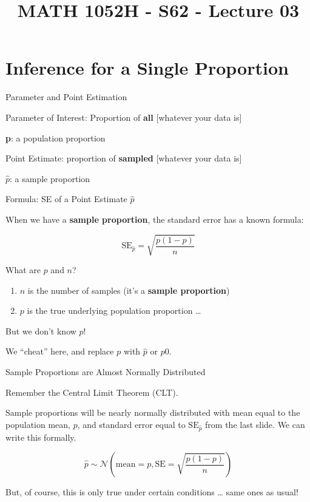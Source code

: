 \documentclass[
  ignorenonframetext,
]{beamer}
\title{MATH 1052H - S62 - Lecture 03}
\date{}
\providecommand{\tightlist}{%
  \setlength{\itemsep}{0pt}\setlength{\parskip}{0pt}}
\begin{document}
\frame{\titlepage}

\begin{frame}

\end{frame}

\hypertarget{inference-for-a-single-proportion}{%
\section{Inference for a Single
Proportion}\label{inference-for-a-single-proportion}}

\begin{frame}{Parameter and Point Estimation}
\protect\hypertarget{parameter-and-point-estimation}{}

\protect\hypertarget{highlight}{}{Parameter of Interest}: Proportion of
\textbf{all} {[}whatever your data is{]}

\textbf{p}: a population proportion

\protect\hypertarget{highlight}{}{Point Estimate}: proportion of
\textbf{sampled} {[}whatever your data is{]}

\textbf{\(\hat{p}\)}: a sample proportion

\end{frame}

\begin{frame}{Formula: SE of a Point Estimate \(\hat{p}\)}
\protect\hypertarget{formula-se-of-a-point-estimate-hatp}{}

When we have a \textbf{sample proportion}, the standard error has a
known formula:

\[
\text{SE}_{\hat{p}} = \sqrt{\frac{p(1-p)}{n}}
\]

What are \(p\) and \(n\)?

\begin{enumerate}
\tightlist
\item
  \(n\) is the number of samples (it's a \textbf{sample proportion})
\item
  \(p\) is the true underlying population proportion \ldots{}
\end{enumerate}

But we don't know \(p\)!

We ``cheat'' here, and replace \(p\) with \(\hat{p}\) or \(p0\).

\end{frame}

\begin{frame}{Sample Proportions are Almost Normally Distributed}
\protect\hypertarget{sample-proportions-are-almost-normally-distributed}{}

Remember the Central Limit Theorem (CLT).

Sample proportions will be nearly normally distributed with mean equal
to the population mean, \(p\), and standard error equal to
\(\text{SE}_\hat{p}\) from the last slide. We can write this formally.

\[
\hat{p} \sim \mathcal{N} \left( \text{mean} = p, \text{SE} = \sqrt{\frac{p(1-p)}{n}} \right)
\]

But, of course, this is only true under certain conditions \ldots{} same
ones as usual!

\end{frame}
\end{document}
